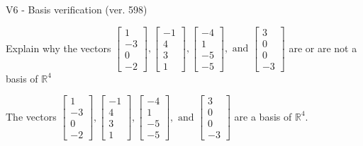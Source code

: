 \begin{exercise}
  \begin{exerciseTitle}V6 - Basis verification (ver. 598)\end{exerciseTitle}
  \begin{exerciseStatement}
    Explain why the vectors \(\left[\begin{array}{r}
1 \\
-3 \\
0 \\
-2
\end{array}\right] , \left[\begin{array}{r}
-1 \\
4 \\
3 \\
1
\end{array}\right] , \left[\begin{array}{r}
-4 \\
1 \\
-5 \\
-5
\end{array}\right] , \text{ and } \left[\begin{array}{r}
3 \\
0 \\
0 \\
-3
\end{array}\right]\) are or are not a basis of \(\mathbb{R}^4\)	


  \end{exerciseStatement}
  \begin{exerciseAnswer}
   The vectors \(\left[\begin{array}{r}
1 \\
-3 \\
0 \\
-2
\end{array}\right] , \left[\begin{array}{r}
-1 \\
4 \\
3 \\
1
\end{array}\right] , \left[\begin{array}{r}
-4 \\
1 \\
-5 \\
-5
\end{array}\right] , \text{ and } \left[\begin{array}{r}
3 \\
0 \\
0 \\
-3
\end{array}\right]\) 
  	 are  a basis of \(\mathbb{R}^4\).
  


  \end{exerciseAnswer}
\end{exercise}